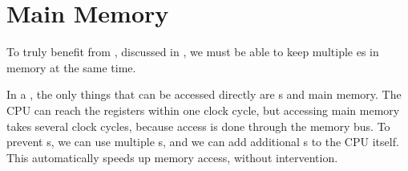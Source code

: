 \section{Main Memory}\label{sec:Main_Memory}
To truly benefit from , discussed in , we must be able to keep multiple es in memory at the same time.

In a , the only things that can be accessed directly are s and main memory.
The CPU can reach the registers within one clock cycle, but accessing main memory takes several clock cycles, because access is done through the memory bus.
To prevent s, we can use multiple s, and we can add additional s to the CPU itself.
This  automatically speeds up memory access, without  intervention.











